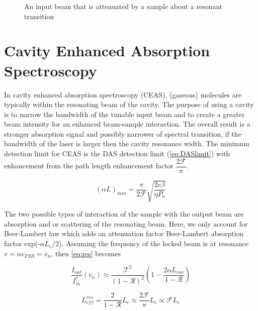 \documentclass[11pt,a4paper]{book}
\newcommand{\imginput}[1]{} %
\begin{document}
		\begin{figure} [!ht]
			\centering
			\def\svgwidth{\columnwidth}
			\resizebox{150mm}{!}{\imginput{images/dir-abs-spec.pdf_tex}}
			\label{fig:dir-abs-spec}
			\caption{An input beam that is attenuated by a sample about a resonant transition}
		\end{figure}		
	
	\section{Cavity Enhanced Absorption Spectroscopy}
		\label{sec:Cavity Enhanced Absorption Spectroscopy}
		In cavity enhanced absorption spectroscopy (CEAS), (gaseous) molecules are typically within the resonating beam of the cavity.
		The purpose of using a cavity is to narrow the bandwidth of the tunable input beam and to create a greater beam intensity for an enhanced beam-sample interaction. The overall result is a stronger absorption signal and possibly narrower of spectral transition, if the bandwidth of the laser is larger then the cavity resonance width. The minimum detection limit for CEAS is the DAS detection limit (\autoref{eq:DASlimit}) with enhancement from the path length enhancement factor $\dfrac{2\mathcal{F}}{\pi}$.
		
		\begin{equation}
			\label{eq:CEASlimit}
			(\alpha L)_{min}=\dfrac{\pi}{2 \mathcal{F}}\sqrt{\dfrac{2e \beta}{\eta P_o}}
		\end{equation}
		
		The two possible types of interaction of the sample with the output beam are absorption and or scattering of the resonating beam. Here, we only account for Beer-Lambert law which adds an attenuation factor Beer-Lambert absorption factor exp(-$\alpha L_c$/2).
		Assuming the frequency of the locked beam is at resonance $v=nv_{FSR}=v_n$, then \eqref{eq:res} becomes 
		
		\begin{equation} 
			\label{eq:CEAS}
			\dfrac{I_{out}}{I_{in}^*}(v_n) \approx \dfrac{\mathcal{T}^2 }{({1 - \mathcal{R}})^2}  
			\left(
				1 - \dfrac{2 \alpha L_{cav}}{1-\mathcal{R}}
			\right)
		\end{equation}
		
		\begin{equation} 
			\label{eq:L_c}
			L_{eff}^{res}=\dfrac{2}{1-\mathcal{R}} L_c 
			\approx
			\dfrac{2\mathcal{F}}{\pi} L_c
			\propto \mathcal{F}L_c
		\end{equation}		
		
\end{document}
